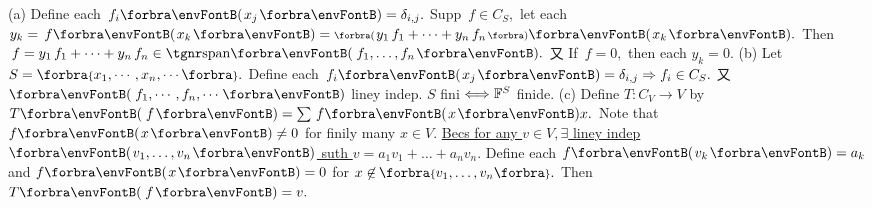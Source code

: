 (a) Define each $\,f_i\Par{x_j}=\delta_{i,j}.$ Supp $\,f\in C_S,$ let each $y_k=\,f\Par{x_k}=\BigPar{y_1\,f_1+\dots+y_n\,f_n}\Par{x_k}.$\parSol{\Ha}
Then $\,f=y_1\,f_1+\dots+y_n\,f_n\in\Span{\,f_1,\dots,f_n}.$ 又 If $\,f=0,$ then each $y_k=0.$\vspace{3pt}\parSol{}
(b) Let $S=\Bra{x_1,\cdots,x_n,\cdots}.$ Define each $\,f_i\Par{x_j}=\delta_{i,j}\Rightarrow f_i\in C_S.$ 又 $\Par{\,f_1,\cdots,f_n,\cdots}$ liney indep.\parSol{\Hb}
\ACoro $S$ fini $\Longleftrightarrow{\mathbb{F}}^S$ finide.\vspace{3pt}\parSol{}
(c) Define $T:C_V\rightarrow V$ by $T\Par{\,f}=\sum\,f\Par{x}x.$ Note that $f\Par{x}\neq0$ for finily many $x\in V.$\parSol{\Hc}
\uline{Becs for any $v\in V,\exists$ liney indep $\Par{v_1,\dots,v_n}$ suth $v=a_1v_1+\dots+a_nv_n.$} \parSol{\Hc}
Define each $\:\!f\Par{v_k}=a_k$ and $f\Par{x}=0$ for $x\not\in\;\!\!\Bra{v_1,\dots,v_n}.$ Then $T\Par{\,f}=v.$\PfEnd
\SepLine


